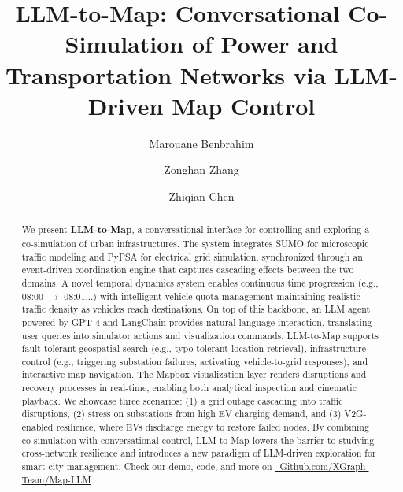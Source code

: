 \documentclass[sigconf,review,nonacm]{acmart}
\begin{document}
\title{LLM-to-Map: Conversational Co-Simulation of Power and Transportation Networks via LLM-Driven Map Control}

\author{Marouane Benbrahim}

\author{Zonghan Zhang}

\author{Zhiqian Chen}

\renewcommand{\shortauthors}{Benbrahim et al.}

\begin{abstract}
We present \textbf{LLM-to-Map}, a conversational interface for controlling and exploring a co-simulation of urban infrastructures. The system integrates SUMO for microscopic traffic modeling and PyPSA for electrical grid simulation, synchronized through an event-driven coordination engine that captures cascading effects between the two domains. A novel temporal dynamics system enables continuous time progression (e.g., 08:00 $\rightarrow$ 08:01...) with intelligent vehicle quota management maintaining realistic traffic density as vehicles reach destinations. On top of this backbone, an LLM agent powered by GPT-4 and LangChain provides natural language interaction, translating user queries into simulator actions and visualization commands. LLM-to-Map supports fault-tolerant geospatial search (e.g., typo-tolerant location retrieval), infrastructure control (e.g., triggering substation failures, activating vehicle-to-grid responses), and interactive map navigation. The Mapbox visualization layer renders disruptions and recovery processes in real-time, enabling both analytical inspection and cinematic playback. We showcase three scenarios: (1) a grid outage cascading into traffic disruptions, (2) stress on substations from high EV charging demand, and (3) V2G-enabled resilience, where EVs discharge energy to restore failed nodes. By combining co-simulation with conversational control, LLM-to-Map lowers the barrier to studying cross-network resilience and introduces a new paradigm of LLM-driven exploration for smart city management. Check our demo, code, and more on \href{https://github.com/XGraph-Team/Map-LLM}{\faGithub\ Github.com/XGraph-Team/Map-LLM}.
\end{abstract}
\end{document}
